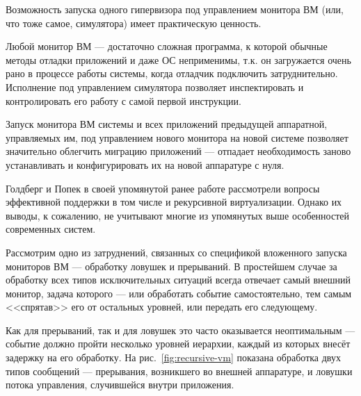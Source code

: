 Возможность запуска одного гипервизора под управлением монитора ВМ (или, что тоже самое, симулятора) имеет практическую ценность. 
\begin{itemize*}
    \item Любой монитор ВМ --- достаточно сложная программа, к которой обычные методы отладки приложений и даже ОС неприменимы, т.к. он загружается очень рано в процессе работы системы, когда отладчик подключить затруднительно. Исполнение под управлением симулятора позволяет инспектировать и контролировать его работу с самой первой инструкции.
    \item Запуск монитора ВМ системы и всех приложений предыдущей аппаратной, управляемых им, под управлением нового монитора на новой системе позволяет значительно облегчить миграцию приложений --- отпадает необходимость заново устанавливать и конфигурировать их на новой аппаратуре с нуля.
\end{itemize*}

Голдберг и Попек в своей упомянутой ранее работе рассмотрели вопросы эффективной поддержки в том числе и рекурсивной виртуализации. Однако их выводы, к сожалению, не учитывают многие из упомянутых выше особенностей современных систем. 

Рассмотрим одно из затруднений, связанных со спецификой вложенного запуска мониторов ВМ --- обработку ловушек и прерываний. 
В простейшем случае за обработку всех типов исключительных ситуаций всегда отвечает самый внешний монитор, задача которого --- или обработать событие самостоятельно, тем самым <<спрятав>> его от остальных уровней, или передать его следующему. 

Как для прерываний, так и для ловушек это часто оказывается неоптимальным --- событие должно пройти несколько уровней иерархии, каждый из которых внесёт задержку на его обработку. На рис.~\ref{fig:recursive-vm} показана обработка двух типов сообщений --- прерывания, возникшего во внешней аппаратуре, и ловушки потока управления, случившейся внутри приложения.

